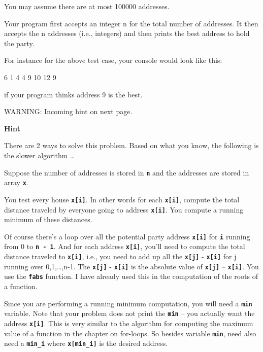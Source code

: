 You may assume there are at most 100000 addresses.

Your program first accepts an integer n for the total number of
addresses. It then accepts the n addresses (i.e., integers) and then
prints the best address to hold the party.

For instance for the above test case, your console would look like this:

\begin{consolethree}[escapeinside=||]
6
1 4 4 9 10 12
9
\end{consolethree}

if your program thinks address 9 is the best.

WARNING: Incoming hint on next page.

\textbf{Hint}

There are 2 ways to solve this problem. Based on what you know, the following is the slower algorithm \ldots

Suppose the number of addresses is stored in \texttt{\textbf{n}} and the addresses are stored in array \texttt{\textbf{x}}.

You test every house \texttt{\textbf{x[i]}}. In other words for each \texttt{\textbf{x[i]}}, compute the total distance traveled by everyone going to address \texttt{\textbf{x[i]}}. You compute a running minimum of these distances.

Of course there's a loop over all the potential party address \texttt{\textbf{x[i]}} for \texttt{\textbf{i}} running from 0 to \texttt{\textbf{n - 1}}. And for each address \texttt{\textbf{x[i]}}, you'll need to compute the total distance traveled to \texttt{\textbf{x[i]}}, i.e., you need to add up all the \texttt{\textbf{x[j]}} - \texttt{\textbf{x[i]}} for j running over 0,1,\ldots,n-1. The \texttt{\textbf{x[j]}} - \texttt{\textbf{x[i]}} is the absolute value of \texttt{\textbf{x[j]}} -- \texttt{\textbf{x[i]}}. You use the \texttt{\textbf{fabs}} function. I have already used this in the computation of the roots of a function.

Since you are performing a running minimum computation, you will need a \texttt{\textbf{min}} variable. Note that your problem does not print the \texttt{\textbf{min}} -- you actually want the address \texttt{\textbf{x[i]}}. This is very similar to the algorithm for computing the maximum value of a function in the chapter on for-loops. So besides variable \texttt{\textbf{min}}, need also need a \texttt{\textbf{min\_i}} where \texttt{\textbf{x[min\_i]}} is the desired address.

